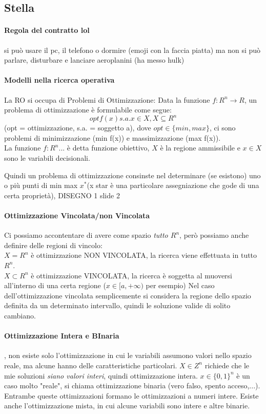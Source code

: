 \documentclass[12pt, a4paper, openany]{book}
\begin{document}
\subsection*{Stella}
\paragraph*{Regola del contratto \small{lol}} si può usare il pc, il telefono o dormire (emoji con la faccia piatta) ma non si può parlare, disturbare e lanciare aeroplanini (ha messo hulk)

\paragraph*{Modelli nella ricerca operativa} La RO si occupa di Problemi di Ottimizzazione:
Data la funzione $f:R^n \to R$, un problema di ottimizzazione è formulabile come segue:
$$opt f(x) s.a. x\in X, X\subseteq R^n$$ 
(opt = ottimizzazione, s.a. = soggetto a), 
dove $opt \in \{min,max\}$, 
ci sono problemi di minimizzazione (min f(x)) e massimizzazione (max f(x)).
\\La funzione $f:R^n...$ è detta funzione obiettivo, $X$ è la regione ammissibile e $x\in X$ sono le variabili decisionali.

Quindi un problema di ottimizzazione consinste nel determinare (se esistono) uno o più punti di min max $x^*$(x star è una particolare assegniazione che gode di una certa proprietà),
{DISEGNO 1 slide 2}
\paragraph*{Ottimizzazione Vincolata/non Vincolata} Ci possiamo accontentare di avere come spazio \emph{tutto $R^n$}, però possiamo anche definire delle regioni di vincolo:
\\$X=R^n$ è ottimizzazione NON VINCOLATA, la ricerca viene effettuata in tutto $R^n$.
\\$X\subset R^n$ è ottimizzazione VINCOLATA, la ricerca è soggetta al muoversi all'interno di una certa regione ($x \in [a, +\infty)$ per esempio)
Nel caso dell'ottimizzazione vincolata semplicemente si considera la regione dello spazio definita da un determinato intervallo, quindi le soluzione valide di solito cambiano.
\paragraph*{Ottimizzazione Intera e BInaria}, non esiste solo l'ottimizzazione in cui le variabili assumono valori nello spazio reale, ma alcune hanno delle caratteristiche particolari.
$X\in Z^n$ richiede che le mie soluzioni \emph{siano valori interi}, quindi ottimizzazione intera.
$x\in \{0,1\}^n$ è un caso molto "reale", si chiama ottimizzazione binaria (vero falso, spento acceso,...). Entrambe queste ottimizzazioni formano le ottimizzazioni a numeri intere.
Esiste anche l'ottimizzazione mista, in cui alcune variabili sono intere e altre binarie.
\end{document}
